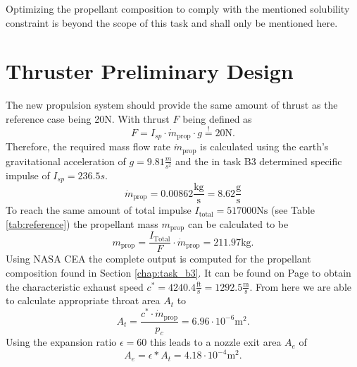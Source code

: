 \documentclass[12pt]{article}
\begin{document}
Optimizing the propellant composition to comply with the mentioned solubility constraint is beyond the scope of this task and shall only be mentioned here.

\section{Thruster Preliminary Design}
The new propulsion system should provide the same amount of thrust as the reference case being 20N. With thrust $F$ being defined as
\begin{equation}
	F = I_{sp} \cdot \dot{m}_{\text{prop}} \cdot g \overset{!}{=} 20\text{N}.
	\label{eq:thrust}
\end{equation}
Therefore, the required mass flow rate $\dot{m}_{\text{prop}}$ is calculated using the earth's gravitational acceleration of $g=9.81\frac{m}{s^2}$ and the in task B3 determined specific impulse of $I_{sp}=236.5s$.
\begin{equation*}
	\dot{m}_{\text{prop}} = 0.00862 \frac{\text{kg}}{\text{s}} = 8.62 \frac{\text{g}}{\text{s}}
\end{equation*}
To reach the same amount of total impulse $I_{\text{total}}=517000\text{Ns}$ (see Table \ref{tab:reference}) the propellant mass $m_{\text{prop}}$ can be calculated to be
\begin{equation*}
	m_{\text{prop}} = \frac{I_{\text{Total}}}{F} \cdot \dot{m}_{\text{prop}} =  211.97\text{kg}.
\end{equation*}
Using NASA CEA the complete output is computed for the propellant composition found in Section \ref{chap:task_b3}. It can be found on Page \pageref{chap:cea_output} to obtain the characteristic exhaust speed $c^*=4240.4\frac{\text{ft}}{\text{s}}=1292.5\frac{\text{m}}{\text{s}}$. From here we are able to calculate appropriate throat area $A_t$ to
\begin{equation}
	A_t = \frac{c^* \cdot \dot{m}_{\text{prop}}}{p_c} = 6.96 \cdot 10^{-6} \text{m}^2.
	\label{eq:throat_ares}
\end{equation}
Using the expansion ratio $\epsilon=60$ this leads to a nozzle exit area $A_e$ of
\begin{equation*}
A_e = \epsilon * A_t = 4.18 \cdot 10^{-4} \text{m}^2.
\end{equation*}

\end{document}
